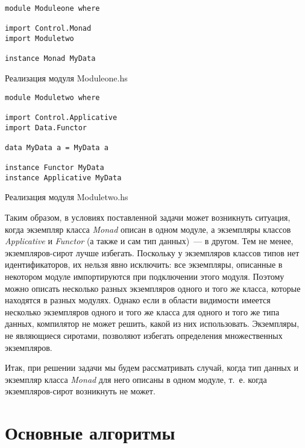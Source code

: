 \begin{ListingEnv}[t]
\begin{lstlisting}
module Moduleone where

import Control.Monad
import Moduletwo

instance Monad MyData
\end{lstlisting}
\caption{Реализация модуля Moduleone.hs}\label{one2}
\end{ListingEnv}

\begin{ListingEnv}[b]
\begin{lstlisting}
module Moduletwo where

import Control.Applicative
import Data.Functor

data MyData a = MyData a

instance Functor MyData
instance Applicative MyData
\end{lstlisting}
\caption{Реализация модуля Moduletwo.hs}\label{two2}
\end{ListingEnv}

Таким образом, в условиях поставленной задачи может возникнуть ситуация, когда экземпляр класса \textit{Monad} описан в одном модуле, а экземпляры классов \textit{Applicative} и \textit{Functor} (а также и сам тип данных)~--- в другом. Тем не менее, экземпляров-сирот лучше избегать. Поскольку у экземпляров классов типов нет идентификаторов, их нельзя явно исключить: все экземпляры, описанные в некотором модуле импортируются при подключении этого модуля. Поэтому можно описать несколько разных экземпляров одного и того же класса, которые находятся в разных модулях. Однако если в области видимости имеется несколько экземпляров одного и того же класса для одного и того же типа данных, компилятор не может решить, какой из них использовать. Экземпляры, не являющиеся сиротами, позволяют избегать определения множественных экземпляров.

Итак, при решении задачи мы будем рассматривать случай, когда тип данных и экземпляр класса \textit{Monad} для него описаны в одном модуле, т.~е. когда экземпляров-сирот возникнуть не может.

\newpage
\chapter{Основные алгоритмы}
